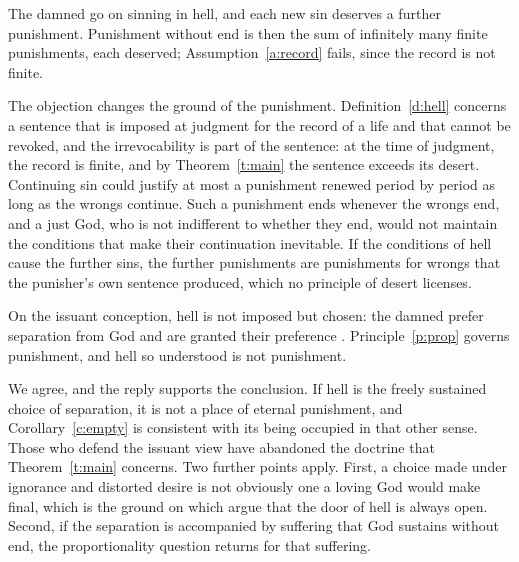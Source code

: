 \documentclass{situationist-preprint}
\begin{document}
\begin{objection}
The damned go on sinning in hell, and each new sin deserves a further punishment. Punishment without end is then the sum of infinitely many finite punishments, each deserved; Assumption~\ref{a:record} fails, since the record is not finite.
\end{objection}

\begin{reply}
The objection changes the ground of the punishment. Definition~\ref{d:hell} concerns a sentence that is imposed at judgment for the record of a life and that cannot be revoked, and the irrevocability is part of the sentence: at the time of judgment, the record is finite, and by Theorem~\ref{t:main} the sentence exceeds its desert. Continuing sin could justify at most a punishment renewed period by period as long as the wrongs continue. Such a punishment ends whenever the wrongs end, and a just God, who is not indifferent to whether they end, would not maintain the conditions that make their continuation inevitable. If the conditions of hell cause the further sins, the further punishments are punishments for wrongs that the punisher's own sentence produced, which no principle of desert licenses.
\end{reply}

\begin{objection}
On the issuant conception, hell is not imposed but chosen: the damned prefer separation from God and are granted their preference \citep{Kvanvig1993,Walls1992}. Principle~\ref{p:prop} governs punishment, and hell so understood is not punishment.
\end{objection}

\begin{reply}
We agree, and the reply supports the conclusion. If hell is the freely sustained choice of separation, it is not a place of eternal punishment, and Corollary~\ref{c:empty} is consistent with its being occupied in that other sense. Those who defend the issuant view have abandoned the doctrine that Theorem~\ref{t:main} concerns. Two further points apply. First, a choice made under ignorance and distorted desire is not obviously one a loving God would make final, which is the ground on which \citet{BuckareffPlug2005} argue that the door of hell is always open. Second, if the separation is accompanied by suffering that God sustains without end, the proportionality question returns for that suffering.
\end{reply}
\end{document}
